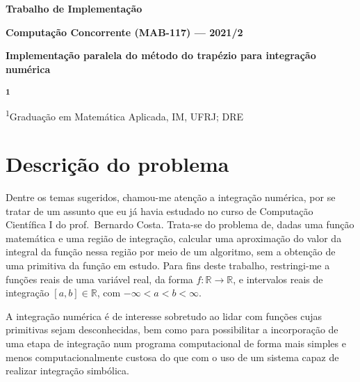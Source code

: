 \documentclass{article}
\newcommand{\R}{\mathbb{R}}
\begin{document}
\begin{center}
  \begin{Large}
    \textbf{Trabalho de Implementação}
  \end{Large}

  \vspace{8pt}

  \begin{large}
    \textbf{Computação Concorrente (MAB-117) — 2021/2}
  \end{large}

  \vspace{8pt}

  \begin{Large}
    \textbf{Implementação paralela do método do trapézio para integração numérica}
  \end{Large}

  \vspace{12pt}

  \begin{large}
    \textbf{\fullname\textsuperscript{1}}  %

    \vspace{5pt}

    \textsuperscript{1}Graduação em Matemática Aplicada, IM, UFRJ; DRE \DRE %
  \end{large}

\end{center}

  \section{Descrição do problema} \label{descr}

  Dentre os temas sugeridos, chamou-me atenção a integração numérica, por se tratar de um assunto que eu já havia estudado no curso de Computação Científica I do prof.\ Bernardo Costa\cite{cci}. Trata-se do problema de, dadas uma função matemática e uma região de integração, calcular uma aproximação do valor da integral da função nessa região por meio de um algoritmo, sem a obtenção de uma primitiva da função em estudo. Para fins deste trabalho, restringi-me a funções reais de uma variável real, da forma $f: \R \to \R$, e intervalos reais de integração $[a, b] \in \R$, com $-\infty < a < b < \infty$.

  A integração numérica é de interesse sobretudo ao lidar com funções cujas primitivas sejam desconhecidas, bem como para possibilitar a incorporação de uma etapa de integração num programa computacional de forma mais simples e menos computacionalmente custosa do que com o uso de um sistema capaz de realizar integração simbólica.
  
\end{document}
